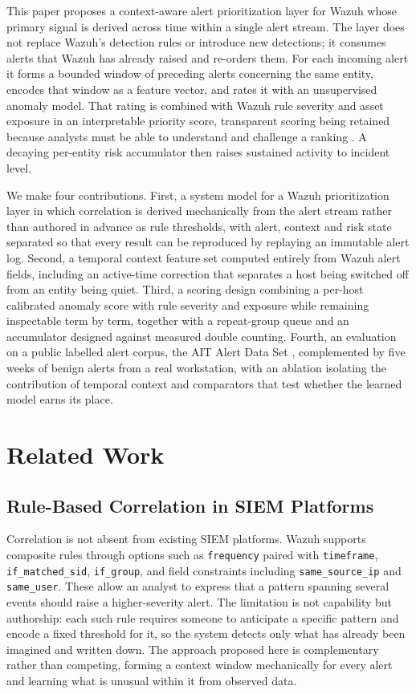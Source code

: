\documentclass[conference]{IEEEtran}
\begin{document}
This paper proposes a context-aware alert prioritization layer for Wazuh whose primary signal is derived across time within a single alert stream. The layer does not replace Wazuh's detection rules or introduce new detections; it consumes alerts that Wazuh has already raised and re-orders them. For each incoming alert it forms a bounded window of preceding alerts concerning the same entity, encodes that window as a feature vector, and rates it with an unsupervised anomaly model. That rating is combined with Wazuh rule severity and asset exposure in an interpretable priority score, transparent scoring being retained because analysts must be able to understand and challenge a ranking \cite{ref9,ref10}. A decaying per-entity risk accumulator then raises sustained activity to incident level.

We make four contributions. First, a system model for a Wazuh prioritization layer in which correlation is derived mechanically from the alert stream rather than authored in advance as rule thresholds, with alert, context and risk state separated so that every result can be reproduced by replaying an immutable alert log. Second, a temporal context feature set computed entirely from Wazuh alert fields, including an active-time correction that separates a host being switched off from an entity being quiet. Third, a scoring design combining a per-host calibrated anomaly score with rule severity and exposure while remaining inspectable term by term, together with a repeat-group queue and an accumulator designed against measured double counting. Fourth, an evaluation on a public labelled alert corpus, the AIT Alert Data Set \cite{ref21}, complemented by five weeks of benign alerts from a real workstation, with an ablation isolating the contribution of temporal context and comparators that test whether the learned model earns its place.

\section{Related Work}

\subsection{Rule-Based Correlation in SIEM Platforms}

Correlation is not absent from existing SIEM platforms. Wazuh supports composite rules through options such as \texttt{frequency} paired with \texttt{timeframe}, \texttt{if\_matched\_sid}, \texttt{if\_group}, and field constraints including \texttt{same\_source\_ip} and \texttt{same\_user}. These allow an analyst to express that a pattern spanning several events should raise a higher-severity alert. The limitation is not capability but authorship: each such rule requires someone to anticipate a specific pattern and encode a fixed threshold for it, so the system detects only what has already been imagined and written down. The approach proposed here is complementary rather than competing, forming a context window mechanically for every alert and learning what is unusual within it from observed data.
\end{document}
